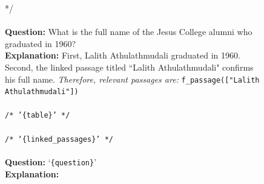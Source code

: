\begin{figure}[htb]
\begin{tcolorbox}
{*/}
 \\
  \\
\textbf{Question:} What is the full name of the Jesus College alumni who graduated in 1960? \\
\textbf{Explanation:} First, Lalith Athulathmudali graduated in 1960. Second, the linked passage titled ``Lalith Athulathmudali" confirms his full name. \textit{Therefore, relevant passages are:} \texttt{f\_passage(["Lalith Athulathmudali"])}
 \\
 \\
\texttt{/* '{\texttt{\{table\}}}' */} \\
 \\
\texttt{/* `{\texttt{\{linked\_passages\}}}' */} \\
 \\
\textbf{Question:} `{\texttt{\{question\}}}' \\
\textbf{Explanation:}

\end{tcolorbox}

\end{figure}


